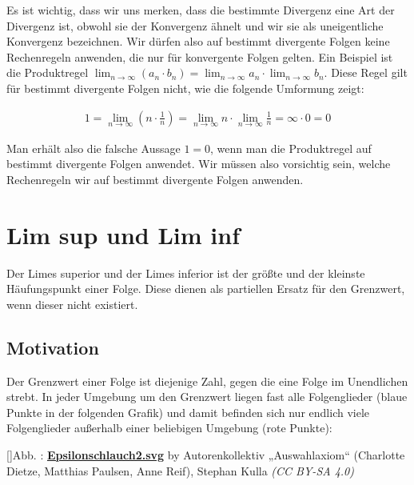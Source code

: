 \documentclass[fontsize=9pt,
               parskip=half-,
               DIV=14,
               listof=chapterentry,
               tocflat]{scrbook}
\newcounter{imagelabel}
\begin{document}
\begin{warning*}
Es ist wichtig, dass wir uns merken, dass die bestimmte Divergenz eine Art der Divergenz ist, obwohl sie der Konvergenz ähnelt und wir sie als uneigentliche Konvergenz bezeichnen. Wir dürfen also auf bestimmt divergente Folgen keine Rechenregeln anwenden, die nur für konvergente Folgen gelten. Ein Beispiel ist die Produktregel $\lim _{n\to \infty }(a_{n}\cdot b_{n})=\lim _{n\to \infty }a_{n}\cdot \lim _{n\to \infty }b_{n}$. Diese Regel gilt für bestimmt divergente Folgen nicht, wie die folgende Umformung zeigt:

\begin{align*}
1=\lim _{n\to \infty }\left(n\cdot {\frac {1}{n}}\right)=\lim _{n\to \infty }n\cdot \lim _{n\to \infty }{\frac {1}{n}}=\infty\cdot 0 =0
\end{align*}

Man erhält also die falsche Aussage $1=0$, wenn man die Produktregel auf bestimmt divergente Folgen anwendet. Wir müssen also vorsichtig sein, welche Rechenregeln wir auf bestimmt divergente Folgen anwenden. 

\end{warning*}

\chapter{Lim sup und Lim inf}

Der Limes superior und der Limes inferior ist der größte und der kleinste Häufungspunkt einer Folge. Diese dienen als partiellen Ersatz für den Grenzwert, wenn dieser nicht existiert.

\section{Motivation}

Der Grenzwert einer Folge ist diejenige Zahl, gegen die eine Folge im Unendlichen strebt. In jeder Umgebung um den Grenzwert liegen fast alle Folgenglieder (blaue Punkte in der folgenden Grafik) und damit befinden sich nur endlich viele Folgenglieder außerhalb einer beliebigen Umgebung (rote Punkte):

[]{Abb. : \protect\href{https://commons.wikimedia.org/wiki/File:Epsilonschlauch2.svg}{\textbf{Epsilonschlauch2.svg}} by Autorenkollektiv „Auswahlaxiom“ (Charlotte Dietze, Matthias Paulsen, Anne Reif), Stephan Kulla \textit{(CC BY-SA 4.0)}}\begin{center}
\end{center}
\end{document}
